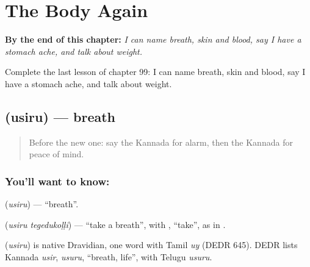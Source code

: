 
\chapter{The Body Again}
\label{ch:ka-the-body-again}

\begin{chapteropening}
\textbf{By the end of this chapter:} \emph{I can name breath, skin and blood, say I have a stomach ache, and talk about weight.}

Complete the last lesson of chapter 99: I can name breath, skin and blood, say I have a stomach ache, and talk about weight.
\end{chapteropening}

\section[\texorpdfstring{\kn{ಉಸಿರು} (usiru)}{ಉಸಿರು (usiru)}]{ (usiru) — breath}

\label{lesson:KA-C99-breath}



\begin{quote}
Before the new one: say the Kannada for alarm, then the Kannada for peace of mind.
\end{quote}

\subsection*{You'll want to know: }
\textbf{} (\emph{usiru}) — \textquotedblleft{}breath\textquotedblright{}.

\textbf{ } (\emph{usiru tegedukoḷḷi}) — \textquotedblleft{}take a breath\textquotedblright{}, with \textbf{}, \textquotedblleft{}take\textquotedblright{}, as in \textbf{ }.

\begin{cousinweb}
\textbf{} (\emph{usiru}) is native Dravidian, one word with Tamil \emph{uy} (DEDR 645). DEDR lists Kannada \emph{usir}, \emph{usuru}, \textquotedblleft{}breath, life\textquotedblright{}, with Telugu \emph{usuru}.
\end{cousinweb}

